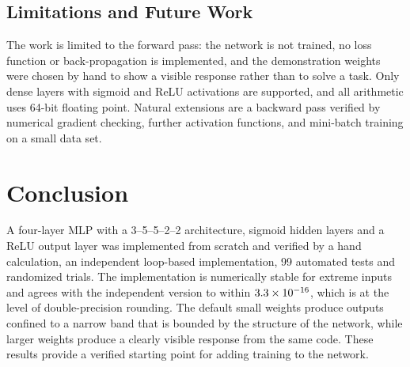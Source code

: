 \documentclass[10pt,letterpaper,twocolumn]{article}
\begin{document}
\subsection{Limitations and Future Work}
The work is limited to the forward pass: the network is not trained, no loss function or back-propagation is implemented, and the demonstration weights were chosen by hand to show a visible response rather than to solve a task. Only dense layers with sigmoid and ReLU activations are supported, and all arithmetic uses 64-bit floating point. Natural extensions are a backward pass verified by numerical gradient checking, further activation functions, and mini-batch training on a small data set.

\section{Conclusion}
A four-layer MLP with a 3--5--5--2--2 architecture, sigmoid hidden layers and a ReLU output layer was implemented from scratch and verified by a hand calculation, an independent loop-based implementation, 99 automated tests and \numRandN{} randomized trials. The implementation is numerically stable for extreme inputs and agrees with the independent version to within $3.3\times 10^{-16}$, which is at the level of double-precision rounding. The default small weights produce outputs confined to a narrow band that is bounded by the structure of the network, while larger weights produce a clearly visible response from the same code. These results provide a verified starting point for adding training to the network.
\end{document}
